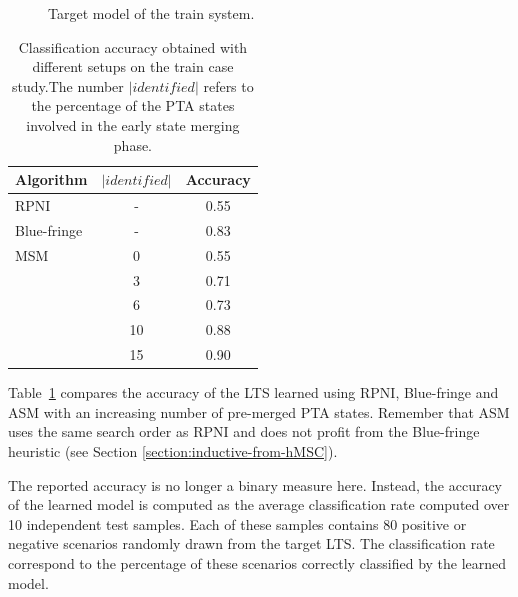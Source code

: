 \begin{figure}[H]
\centering
{}
\caption{Target model of the train system.\label{image:case-studies-big-train-2}}
\end{figure}

\begin{table}[H]
\centering
\small
\begin{tabular}{|l|c|c|}\hline
Algorithm& $|identified|$ &Accuracy\\\hline\hline
RPNI      & -  & 0.55\\\hline
Blue-fringe& -  & 0.83\\\hline
MSM       & 0  & 0.55\\\cline{2-3}
          & 3  & 0.71\\\cline{2-3}
          & 6  & 0.73\\\cline{2-3}
          & 10 & 0.88\\\cline{2-3}
          & 15 & 0.90\\\hline
\end{tabular}
\caption{Classification accuracy obtained with different setups on the train case study.\label{RE:experesults} The number $|identified|$ refers to the percentage of the PTA states involved in the early state merging phase.}
\end{table} 

Table~\ref{RE:experesults} compares the accuracy of the LTS learned using RPNI, Blue-fringe and ASM with an increasing number of pre-merged PTA states. Remember that ASM uses the same search order as RPNI and does not profit from the Blue-fringe heuristic (see Section \ref{section:inductive-from-hMSC}).

The reported accuracy is no longer a binary measure here. Instead, the accuracy of the learned model is computed as the average classification rate computed over 10 independent test samples. Each of these samples contains 80 positive or negative scenarios randomly drawn from the target LTS. The classification rate correspond to the percentage of these scenarios correctly classified by the learned model. 

